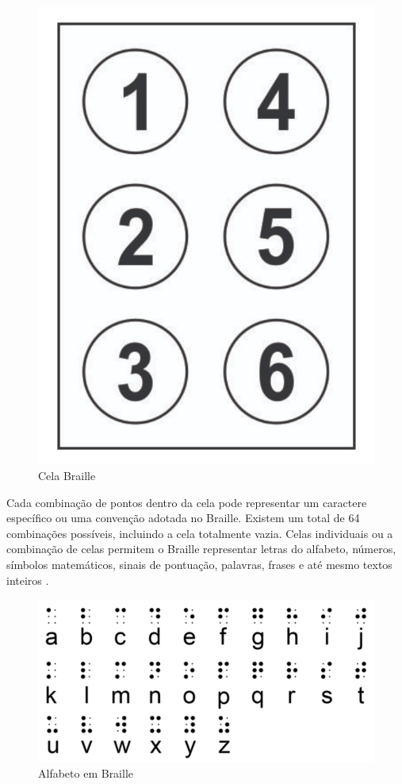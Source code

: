 \begin{figure}[h]
    \centering
    \includegraphics[scale=0.5]{ch02/assets/braille-cell.png}
    \decoRule
    \caption[Cela Braille]{Cela Braille}
    \label{fig:ch02-braille-cell}
\end{figure}

Cada combinação de pontos dentro da cela pode representar um caractere específico ou uma convenção adotada no Braille. Existem um total de 64 combinações possíveis, incluindo a cela totalmente vazia. Celas individuais ou a combinação de celas permitem o Braille representar letras do alfabeto, números, símbolos matemáticos, sinais de pontuação, palavras, frases e até mesmo textos inteiros \parencite{REF05}.

\begin{figure}[h]
    \centering
    \includegraphics[scale=0.5]{ch02/assets/braille-alphabet.png}
    \decoRule
    \caption[Alfabeto em Braille]{Alfabeto em Braille}
    \label{fig:ch02-braille-alphabet}
\end{figure}

